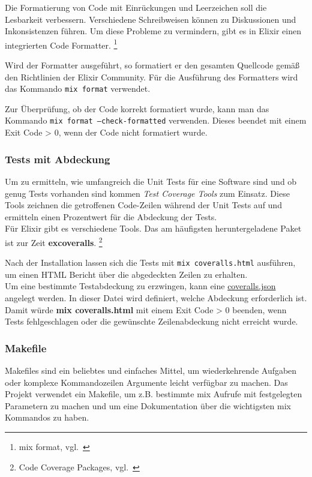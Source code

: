 Die Formatierung von Code mit Einrückungen und Leerzeichen soll die Lesbarkeit verbessern.
Verschiedene Schreibweisen können zu Diskussionen und Inkonsistenzen führen.
Um diese Probleme zu vermindern, gibt es in Elixir einen integrierten Code Formatter.
\footnote{{mix format, vgl.~\cite{ELIXIR_FORMATTER}}}

Wird der Formatter ausgeführt, so formatiert er den gesamten Quellcode gemäß den Richtlinien der Elixir Community.
Für die Ausführung des Formatters wird das Kommando \texttt{mix format} verwendet.

Zur Überprüfung, ob der Code korrekt formatiert wurde, kann man das Kommando \texttt{mix format --check-formatted} verwenden.
Dieses beendet mit einem Exit Code > 0, wenn der Code nicht formatiert wurde.


\subsubsection{Tests mit Abdeckung}

Um zu ermitteln, wie umfangreich die Unit Tests für eine Software sind und ob genug Tests vorhanden sind kommen \textsl{Test Coverage Tools} zum Einsatz.
Diese Tools zeichnen die getroffenen Code-Zeilen während der Unit Tests auf und ermitteln einen Prozentwert für die Abdeckung der Tests. \\

Für Elixir gibt es verschiedene Tools.
Das am häufigsten heruntergeladene Paket ist zur Zeit \textbf{excoveralls}.
\footnote{{Code Coverage Packages, vgl.~\cite{ELIXIR_HEX_COVERAGE_TOOLS}}}

Nach der Installation lassen sich die Tests mit \texttt{mix coveralls.html} ausführen, um einen HTML Bericht über die abgedeckten Zeilen zu erhalten. \\

Um eine bestimmte Testabdeckung zu erzwingen, kann eine \hyperref[lst:projekt_coveralls_json]{coveralls.json} angelegt werden.
In dieser Datei wird definiert, welche Abdeckung erforderlich ist.
Damit würde \textbf{mix coveralls.html} mit einem Exit Code > 0 beenden, wenn Tests fehlgeschlagen oder die gewünschte Zeilenabdeckung nicht erreicht wurde.


\newpage
\subsubsection{Makefile}

Makefiles sind ein beliebtes und einfaches Mittel, um wiederkehrende Aufgaben oder komplexe Kommandozeilen Argumente leicht verfügbar zu machen.
Das Projekt verwendet ein Makefile, um z.B. bestimmte mix Aufrufe mit festgelegten Parametern zu machen und um eine Dokumentation über die wichtigsten mix Kommandos zu haben.

